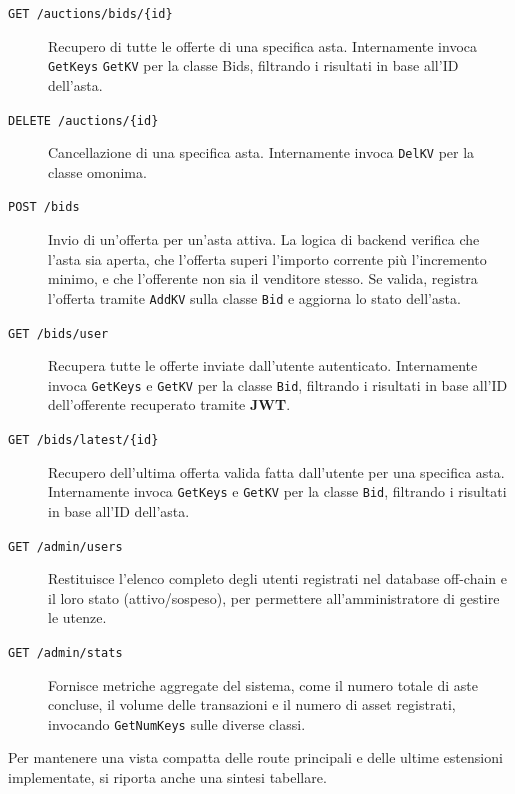 \begin{description}
    \item[\texttt{GET /auctions/bids/\{id\}}]
    Recupero di tutte le offerte di una specifica asta. Internamente invoca \texttt{GetKeys} \texttt{GetKV} per la classe Bids, filtrando i risultati in base all'ID dell'asta.

    \item[\texttt{DELETE /auctions/\{id\}}]
    Cancellazione di una specifica asta. Internamente invoca \texttt{DelKV} per la classe omonima.

    \item[\texttt{POST /bids}] 
    Invio di un'offerta per un'asta attiva. La logica di backend verifica che l'asta sia aperta, che l'offerta superi l'importo corrente più l'incremento minimo, e che l'offerente non sia il venditore stesso. Se valida, registra l'offerta tramite \texttt{AddKV} sulla classe \texttt{Bid} e aggiorna lo stato dell'asta.
    
    \item[\texttt{GET /bids/user}]
    Recupera tutte le offerte inviate dall'utente autenticato. Internamente invoca \texttt{GetKeys} e \texttt{GetKV} per la classe \texttt{Bid}, filtrando i risultati in base all'ID dell'offerente recuperato tramite \textbf{JWT}.

    \item[\texttt{GET /bids/latest/\{id\}}]
    Recupero dell'ultima offerta valida fatta dall'utente per una specifica asta. Internamente invoca \texttt{GetKeys} e \texttt{GetKV} per la classe \texttt{Bid}, filtrando i risultati in base all'ID dell'asta.

    \item[\texttt{GET /admin/users}] 
    Restituisce l'elenco completo degli utenti registrati nel database off-chain e il loro stato (attivo/sospeso), per permettere all'amministratore di gestire le utenze.

    \item[\texttt{GET /admin/stats}] 
    Fornisce metriche aggregate del sistema, come il numero totale di aste concluse, il volume delle transazioni e il numero di asset registrati, invocando \texttt{GetNumKeys} sulle diverse classi.

\end{description}

Per mantenere una vista compatta delle route principali e delle ultime estensioni implementate, si riporta anche una sintesi tabellare.

